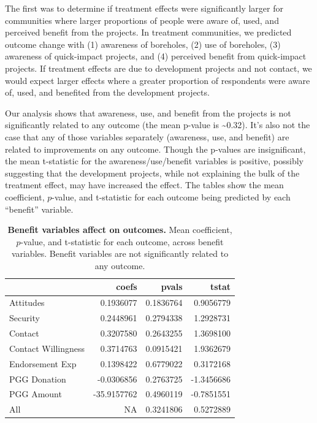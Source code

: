 \documentclass[
]{article}
\begin{document}
The first was to determine if treatment effects were significantly
larger for communities where larger proportions of people were aware of,
used, and perceived benefit from the projects. In treatment communities,
we predicted outcome change with (1) awareness of boreholes, (2) use of
boreholes, (3) awareness of quick-impact projects, and (4) perceived
benefit from quick-impact projects. If treatment effects are due to
development projects and not contact, we would expect larger effects
where a greater proportion of respondents were aware of, used, and
benefited from the development projects.

Our analysis shows that awareness, use, and benefit from the projects is
not significantly related to any outcome (the mean p-value is
\textasciitilde0.32). It's also not the case that any of those variables
separately (awareness, use, and benefit) are related to improvements on
any outcome. Though the p-values are insignificant, the mean t-statistic
for the awareness/use/benefit variables is positive, possibly suggesting
that the development projects, while not explaining the bulk of the
treatment effect, may have increased the effect. The tables show the
mean coefficient, \(p\)-value, and t-statistic for each outcome being
predicted by each ``benefit'' variable.

\begin{table}[H]
\begin{center}
\label{tab:benefit_df_tab}
\caption{\textbf{Benefit variables affect on outcomes.} Mean coefficient, $p$-value, and t-statistic for each outcome, across benefit variables. Benefit variables are not significantly related to any outcome.}
\smallskip

\begin{tabular}{l|r|r|r}
\hline
  & coefs & pvals & tstat\\
\hline
Attitudes & 0.1936077 & 0.1836764 & 0.9056779\\
\hline
Security & 0.2448961 & 0.2794338 & 1.2928731\\
\hline
Contact & 0.3207580 & 0.2643255 & 1.3698100\\
\hline
Contact Willingness & 0.3714763 & 0.0915421 & 1.9362679\\
\hline
Endorsement Exp & 0.1398422 & 0.6779022 & 0.3172168\\
\hline
PGG Donation & -0.0306856 & 0.2763725 & -1.3456686\\
\hline
PGG Amount & -35.9157762 & 0.4960119 & -0.7851551\\
\hline
All & NA & 0.3241806 & 0.5272889\\
\hline
\end{tabular}


\end{center}
\end{table}
\end{document}
